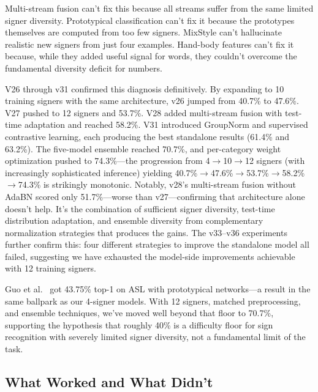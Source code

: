 \documentclass[conference]{IEEEtran}
\begin{document}
Multi-stream fusion can't fix this because all streams suffer from the same limited signer diversity. Prototypical classification can't fix it because the prototypes themselves are computed from too few signers. MixStyle can't hallucinate realistic new signers from just four examples. Hand-body features can't fix it because, while they added useful signal for words, they couldn't overcome the fundamental diversity deficit for numbers.

V26 through v31 confirmed this diagnosis definitively. By expanding to 10 training signers with the same architecture, v26 jumped from 40.7\% to 47.6\%. V27 pushed to 12 signers and 53.7\%. V28 added multi-stream fusion with test-time adaptation and reached 58.2\%. V31 introduced GroupNorm and supervised contrastive learning, each producing the best standalone results (61.4\% and 63.2\%). The five-model ensemble reached 70.7\%, and per-category weight optimization pushed to 74.3\%---the progression from 4$\to$10$\to$12 signers (with increasingly sophisticated inference) yielding 40.7\%$\to$47.6\%$\to$53.7\%$\to$58.2\%$\to$74.3\% is strikingly monotonic. Notably, v28's multi-stream fusion without AdaBN scored only 51.7\%---worse than v27---confirming that architecture alone doesn't help. It's the combination of sufficient signer diversity, test-time distribution adaptation, and ensemble diversity from complementary normalization strategies that produces the gains. The v33--v36 experiments further confirm this: four different strategies to improve the standalone model all failed, suggesting we have exhausted the model-side improvements achievable with 12 training signers.

Guo et al.~\cite{guo2024fewshot} got 43.75\% top-1 on ASL with prototypical networks---a result in the same ballpark as our 4-signer models. With 12 signers, matched preprocessing, and ensemble techniques, we've moved well beyond that floor to 70.7\%, supporting the hypothesis that roughly 40\% is a difficulty floor for sign recognition with severely limited signer diversity, not a fundamental limit of the task.

\subsection{What Worked and What Didn't}
\end{document}
